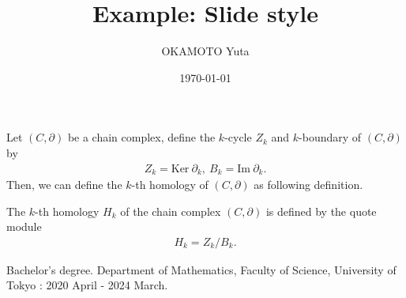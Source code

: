 \documentclass[dvipdfmx,11pt,notheorems]{beamer}
\title{Example: Slide style}
\author{OKAMOTO Yuta}
\institute{Division of Informatics, Graduate School of Informatics, Kyoto University}
\date{\today}
\begin{document}
\begin{frame}
  \titlepage
\end{frame}

\begin{frame}
  Let $\left( C, \partial \right)$ be a chain complex, define the $k$-cycle $Z_k$ and $k$-boundary of $\left( C, \partial \right)$ by
  \begin{align*}
    Z_k = \mathrm{Ker}\ \partial_k,\ B_k = \mathrm{Im}\ \partial_k.
  \end{align*}
  Then, we can define the $k$-th homology of $\left( C, \partial \right)$ as following definition.
  \begin{dfn}
    The $k$-th homology $H_k$ of the chain complex $\left( C, \partial \right)$ is defined by the quote module
    \begin{align*}
      H_k = Z_k / B_k.
    \end{align*}
  \end{dfn}
\end{frame}

\begin{frame}[containsverbatim]

  Bachelor's degree. Department of Mathematics, Faculty of Science, University of Tokyo : 2020 April - 2024 March.

  
\end{frame}
\end{document}
